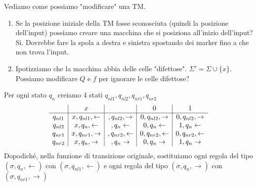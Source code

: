 \documentclass{article}
\newcommand{\tvs}[0]{\textvisiblespace}
\begin{document}
Vediamo come possiamo "modificare" una TM.
\begin{enumerate}
    \item Se la posizione iniziale della TM fosse sconosciuta (quindi la posizione dell'input) possiamo creare una macchina che si posiziona all'inizio dell'input? Si. Dovrebbe fare la spola a destra e sinistra spostando dei marker fino a che non trova l'input.
    \item Ipotizziamo che la macchina abbia delle celle "difettose". $\Sigma' = \Sigma\cup\{x\}$. Possiamo modificare $Q$ e $f$ per ignorare le celle difettose?
\end{enumerate}

Per ogni stato $q_n$ creiamo 4 stati $q_{nl1},q_{nl2}, q_{nr1},q_{nr2}$
\begin{align*}
    \begin{array}{c|c|c|c|c}
                    & x & \tvs & 0 & 1 \\
        \hline
        q_{nl1} & x,q_{nl1},\leftarrow & \tvs,q_{nl2},\rightarrow & 0,q_{nl2},\rightarrow & 0,q_{nl2},\rightarrow \\
        q_{nl2} & x,q_n,\leftarrow & \tvs,q_n\leftarrow & 0,q_n\leftarrow & 1,q_n\leftarrow \\
        q_{nr1} & x,q_{nr1},\rightarrow & \tvs,q_{nr2},\leftarrow & 0,q_{nr2},\leftarrow & 0,q_{nr2},\leftarrow \\
        q_{nr2} & x,q_n,\rightarrow & \tvs,q_n\rightarrow & 0,q_n\rightarrow & 1,q_n\rightarrow \\
    \end{array}
\end{align*}
Dopodiché, nella funzione di transizione originale, sostituiamo ogni regola del tipo $(\sigma,q_n,\leftarrow)$ con $(\sigma,q_{nl1},\leftarrow)$ e ogni regola del tipo $(\sigma,q_n,\rightarrow)$ con $(\sigma,q_{nr1},\rightarrow)$
\end{document}
